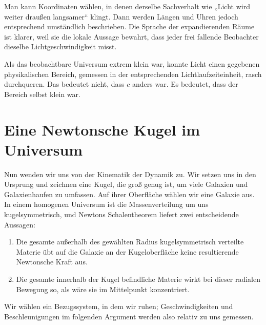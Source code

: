 Man kann Koordinaten wählen, in denen derselbe Sachverhalt wie „Licht wird weiter draußen langsamer“ klingt. Dann werden Längen und Uhren jedoch entsprechend umständlich beschrieben. Die Sprache der expandierenden Räume ist klarer, weil sie die lokale Aussage bewahrt, dass jeder frei fallende Beobachter dieselbe Lichtgeschwindigkeit misst.

\begin{classroomqa}
\end{classroomqa}

Als das beobachtbare Universum extrem klein war, konnte Licht einen gegebenen physikalischen Bereich, gemessen in der entsprechenden Lichtlaufzeiteinheit, rasch durchqueren. Das bedeutet nicht, dass \(c\) anders war. Es bedeutet, dass der Bereich selbst klein war.

\section{Eine Newtonsche Kugel im Universum}

Nun wenden wir uns von der Kinematik der Dynamik zu. Wir setzen uns in den Ursprung und zeichnen eine Kugel, die groß genug ist, um viele Galaxien und Galaxienhaufen zu umfassen. Auf ihrer Oberfläche wählen wir eine Galaxie aus. In einem homogenen Universum ist die Massenverteilung um uns kugelsymmetrisch, und Newtons Schalentheorem liefert zwei entscheidende Aussagen:
\begin{enumerate}
  \item Die gesamte außerhalb des gewählten Radius kugelsymmetrisch verteilte Materie übt auf die Galaxie an der Kugeloberfläche keine resultierende Newtonsche Kraft aus.
  \item Die gesamte innerhalb der Kugel befindliche Materie wirkt bei dieser radialen Bewegung so, als wäre sie im Mittelpunkt konzentriert.
\end{enumerate}
Wir wählen ein Bezugssystem, in dem wir ruhen; Geschwindigkeiten und Beschleunigungen im folgenden Argument werden also relativ zu uns gemessen.

